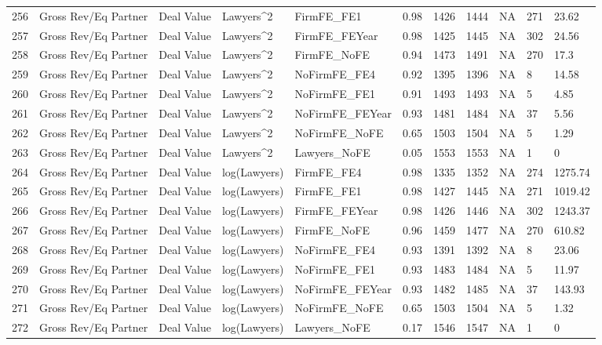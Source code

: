 \documentclass{article}
\begin{document}
\begin{table}[H]
\begin{tabular}{rllllllllll}
  256 & Gross Rev/Eq Partner & Deal Value & Lawyers^2 & FirmFE\_FE1 & 0.98 & 1426 & 1444 & NA & 271 & 23.62 \\ 
  257 & Gross Rev/Eq Partner & Deal Value & Lawyers^2 & FirmFE\_FEYear & 0.98 & 1425 & 1445 & NA & 302 & 24.56 \\ 
  258 & Gross Rev/Eq Partner & Deal Value & Lawyers^2 & FirmFE\_NoFE & 0.94 & 1473 & 1491 & NA & 270 & 17.3 \\ 
  259 & Gross Rev/Eq Partner & Deal Value & Lawyers^2 & NoFirmFE\_FE4 & 0.92 & 1395 & 1396 & NA & 8 & 14.58 \\ 
  260 & Gross Rev/Eq Partner & Deal Value & Lawyers^2 & NoFirmFE\_FE1 & 0.91 & 1493 & 1493 & NA & 5 & 4.85 \\ 
  261 & Gross Rev/Eq Partner & Deal Value & Lawyers^2 & NoFirmFE\_FEYear & 0.93 & 1481 & 1484 & NA & 37 & 5.56 \\ 
  262 & Gross Rev/Eq Partner & Deal Value & Lawyers^2 & NoFirmFE\_NoFE & 0.65 & 1503 & 1504 & NA & 5 & 1.29 \\ 
  263 & Gross Rev/Eq Partner & Deal Value & Lawyers^2 & Lawyers\_NoFE & 0.05 & 1553 & 1553 & NA & 1 & 0 \\ 
  264 & Gross Rev/Eq Partner & Deal Value & log(Lawyers) & FirmFE\_FE4 & 0.98 & 1335 & 1352 & NA & 274 & 1275.74 \\ 
  265 & Gross Rev/Eq Partner & Deal Value & log(Lawyers) & FirmFE\_FE1 & 0.98 & 1427 & 1445 & NA & 271 & 1019.42 \\ 
  266 & Gross Rev/Eq Partner & Deal Value & log(Lawyers) & FirmFE\_FEYear & 0.98 & 1426 & 1446 & NA & 302 & 1243.37 \\ 
  267 & Gross Rev/Eq Partner & Deal Value & log(Lawyers) & FirmFE\_NoFE & 0.96 & 1459 & 1477 & NA & 270 & 610.82 \\ 
  268 & Gross Rev/Eq Partner & Deal Value & log(Lawyers) & NoFirmFE\_FE4 & 0.93 & 1391 & 1392 & NA & 8 & 23.06 \\ 
  269 & Gross Rev/Eq Partner & Deal Value & log(Lawyers) & NoFirmFE\_FE1 & 0.93 & 1483 & 1484 & NA & 5 & 11.97 \\ 
  270 & Gross Rev/Eq Partner & Deal Value & log(Lawyers) & NoFirmFE\_FEYear & 0.93 & 1482 & 1485 & NA & 37 & 143.93 \\ 
  271 & Gross Rev/Eq Partner & Deal Value & log(Lawyers) & NoFirmFE\_NoFE & 0.65 & 1503 & 1504 & NA & 5 & 1.32 \\ 
  272 & Gross Rev/Eq Partner & Deal Value & log(Lawyers) & Lawyers\_NoFE & 0.17 & 1546 & 1547 & NA & 1 & 0 \\ 

\end{tabular}
\end{table}
\end{document}
